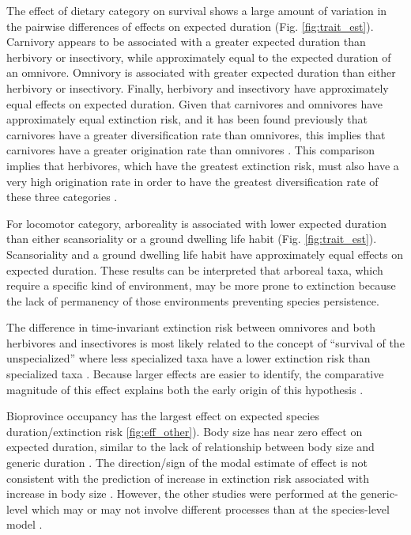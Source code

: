 \documentclass[12pt]{article}
\begin{document}
The effect of dietary category on survival shows a large amount of variation in the pairwise differences of effects on expected duration (Fig. \ref{fig:trait_est}). Carnivory appears to be associated with a greater expected duration than herbivory or insectivory, while approximately equal to the expected duration of an omnivore. Omnivory is associated with greater expected duration than either herbivory or insectivory. Finally, herbivory and insectivory have approximately equal effects on expected duration. 
Given that carnivores and omnivores have approximately equal extinction risk, and it has been found previously that carnivores have a greater diversification rate than omnivores, this implies that carnivores have a greater origination rate than omnivores \cite{Price2012}. This comparison implies that herbivores, which have the greatest extinction risk, must also have a very high origination rate in order to have the greatest diversification rate of these three categories \cite{Price2012}. 

For locomotor category, arboreality is associated with lower expected duration than either scansoriality or a ground dwelling life habit (Fig. \ref{fig:trait_est}). Scansoriality and a ground dwelling life habit have approximately equal effects on expected duration. These results can be interpreted that arboreal taxa, which require a specific kind of environment, may be more prone to extinction because the lack of permanency of those environments preventing species persistence. 

The difference in time-invariant extinction risk between omnivores and both herbivores and insectivores is most likely related to the concept of ``survival of the unspecialized'' where less specialized taxa have a lower extinction risk than specialized taxa \cite{Liow2004a,Simpson1944}. Because larger effects are easier to identify, the comparative magnitude of this effect explains both the early origin of this hypothesis \cite{Simpson1944}. 

Bioprovince occupancy has the largest effect on expected species duration/extinction risk \ref{fig:eff_other}). Body size has near zero effect on expected duration, similar to the lack of relationship between body size and generic duration \cite{Tomiya2013}. The direction/sign of the modal estimate of effect is not consistent with the prediction of increase in extinction risk associated with increase in body size \cite{Liow2008}. However, the other studies were performed at the generic-level which may or may not involve different processes than at the species-level model \cite{Tomiya2013,Liow2008}.
\end{document}
